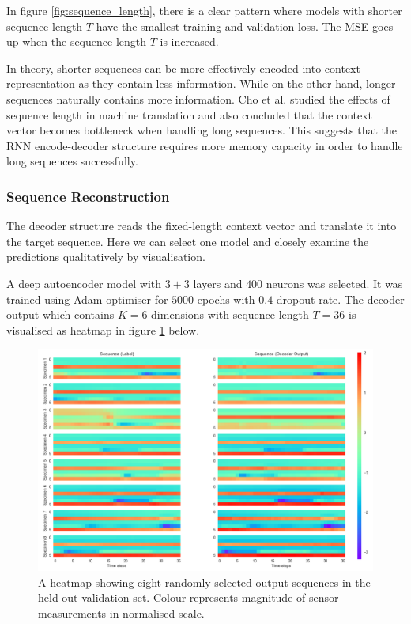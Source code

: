 \documentclass[11pt]{article} %
\theoremstyle{plain}
\theoremstyle{definition}
\begin{document}
In figure \ref{fig:sequence_length}, there is a clear pattern where models with shorter sequence length \(T\) have the smallest training and validation loss. The MSE goes up when the sequence length \(T\) is increased.

In theory, shorter sequences can be more effectively encoded into context representation as they contain less information. While on the other hand, longer sequences naturally contains more information. Cho et al. \cite{cho2014b} studied the effects of sequence length in machine translation and also concluded that the context vector becomes bottleneck when handling long sequences. This suggests that the RNN encode-decoder structure requires more memory capacity in order to handle long sequences successfully.

\subsubsection{Sequence Reconstruction}

The decoder structure reads the fixed-length context vector and translate it into the target sequence. Here we can select one model and closely examine the predictions qualitatively by visualisation.

A deep autoencoder model with \(3+3\) layers and \(400\) neurons was selected. It was trained using Adam optimiser for \(5000\) epochs with \(0.4\) dropout rate. The decoder output which contains \(K=6\) dimensions with sequence length \(T=36\) is visualised as heatmap in figure \ref{fig:heatmaps} below.

\begin{figure}[H]
	\centering
	\includegraphics[width=1\textwidth]{heatmaps.PNG}
	\caption{A heatmap showing eight randomly selected output sequences in the held-out validation set. Colour represents magnitude of sensor measurements in normalised scale.}
	\label{fig:heatmaps}
\end{figure}
\end{document}
